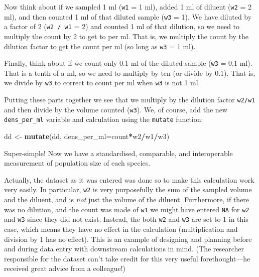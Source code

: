 \documentclass[]{book}
\newenvironment{Shaded}{\begin{snugshade}}{\end{snugshade}}
\newcommand{\DataTypeTok}[1]{\textcolor[rgb]{0.13,0.29,0.53}{#1}}
\newcommand{\KeywordTok}[1]{\textcolor[rgb]{0.13,0.29,0.53}{\textbf{#1}}}
\newcommand{\NormalTok}[1]{#1}
\newcommand{\OperatorTok}[1]{\textcolor[rgb]{0.81,0.36,0.00}{\textbf{#1}}}
\newcommand{\StringTok}[1]{\textcolor[rgb]{0.31,0.60,0.02}{#1}}
\begin{document}
Now think about if we sampled 1 ml (\texttt{w1} = 1 ml), added 1 ml of diluent (\texttt{w2} = 2 ml), and then counted 1 ml of that diluted sample (\texttt{w3} = 1). We have diluted by a factor of 2 (\texttt{w2\ /\ w1} = 2) and counted 1 ml of that dilution, so we need to multiply the count by 2 to get to per ml. That is, we multiply the count by the dilution factor to get the count per ml (so long as \texttt{w3} = 1 ml).

Finally, think about if we count only 0.1 ml of the diluted sample (\texttt{w3} = 0.1 ml). That is a tenth of a ml, so we need to multiply by ten (or divide by 0.1). That is, we divide by \texttt{w3} to correct to count per ml when \texttt{w3} is not 1 ml.

Putting these parts together we see that we multiply by the dilution factor \texttt{w2/w1} and then divide by the volume counted (\texttt{w3}). We, of course, add the new \texttt{dens\_per\_ml} variable and calculation using the \texttt{mutate} function:

\begin{Shaded}
\begin{Highlighting}[]
\NormalTok{dd <-}\StringTok{ }\KeywordTok{mutate}\NormalTok{(dd, }\DataTypeTok{dens_per_ml=}\NormalTok{count}\OperatorTok{*}\NormalTok{w2}\OperatorTok{/}\NormalTok{w1}\OperatorTok{/}\NormalTok{w3)}
\end{Highlighting}
\end{Shaded}

Super-simple! Now we have a standardised, comparable, and interoperable measurement of population size of each species.

\begin{efficiency}
Actually, the dataset as it was entered was done so to make this
calculation work very easily. In particular, \texttt{w2} is very
purposefully the sum of the sampled volume and the diluent, and is
\emph{not} just the volume of the diluent. Furthermore, if there was no
dilution, and the count was made of \texttt{w1} we might have entered
\texttt{NA} for \texttt{w2} and \texttt{w3} since they did not exist.
Instead, the both \texttt{w2} and \texttt{w3} are set to 1 in this case,
which means they have no effect in the calculation (multiplication and
division by 1 has no effect). This is an example of designing and
planning before and during data entry with downstream calculations in
mind. (The researcher responsible for the dataset can't take credit for
this very useful forethought---he received great advice from a
colleague!)
\end{efficiency}
\end{document}
